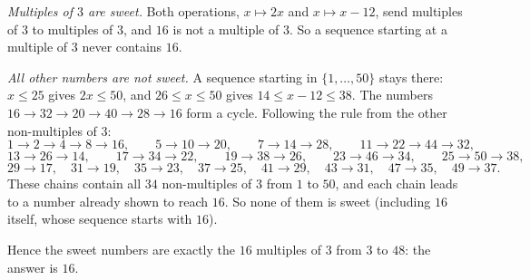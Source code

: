 \emph{Multiples of $3$ are sweet.} Both operations, $x\mapsto2x$ and $x\mapsto x-12$, send multiples of $3$ to multiples of $3$, and $16$ is not a multiple of $3$. So a sequence starting at a multiple of $3$ never contains $16$.

\emph{All other numbers are not sweet.} A sequence starting in $\{1,\dots,50\}$ stays there: $x\le25$ gives $2x\le50$, and $26\le x\le50$ gives $14\le x-12\le38$. The numbers $16\to32\to20\to40\to28\to16$ form a cycle. Following the rule from the other non-multiples of $3$:
\[1\to2\to4\to8\to16,\qquad5\to10\to20,\qquad7\to14\to28,\qquad11\to22\to44\to32,\]
\[13\to26\to14,\qquad17\to34\to22,\qquad19\to38\to26,\qquad23\to46\to34,\qquad25\to50\to38,\]
\[29\to17,\quad31\to19,\quad35\to23,\quad37\to25,\quad41\to29,\quad43\to31,\quad47\to35,\quad49\to37.\]
These chains contain all $34$ non-multiples of $3$ from $1$ to $50$, and each chain leads to a number already shown to reach $16$. So none of them is sweet (including $16$ itself, whose sequence starts with $16$).

Hence the sweet numbers are exactly the $16$ multiples of $3$ from $3$ to $48$: the answer is $\boxed{16}$.
